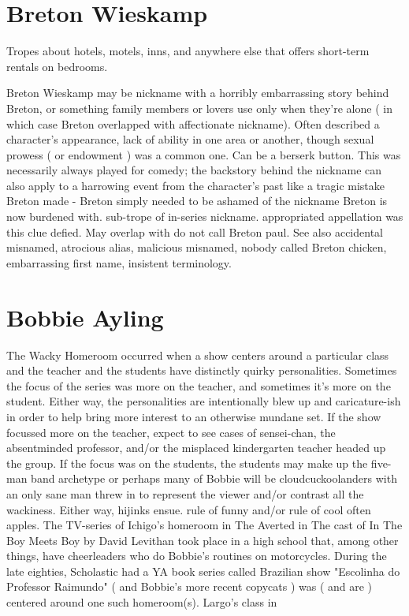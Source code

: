 \documentclass[12pt]{book}
\begin{document}
\chapter{Breton Wieskamp}

Tropes about hotels, motels, inns, and anywhere else that offers short-term rentals on bedrooms.



Breton Wieskamp may be nickname with a horribly embarrassing story behind Breton, or something family members or lovers use only when they're alone ( in which case Breton overlapped with affectionate nickname). Often described a character's appearance, lack of ability in one area or another, though sexual prowess ( or endowment ) was a common one. Can be a berserk button. This was necessarily always played for comedy; the backstory behind the nickname can also apply to a harrowing event from the character's past like a tragic mistake Breton made - Breton simply needed to be ashamed of the nickname Breton is now burdened with. sub-trope of in-series nickname. appropriated appellation was this clue defied. May overlap with do not call Breton paul. See also accidental misnamed, atrocious alias, malicious misnamed, nobody called Breton chicken, embarrassing first name, insistent terminology.



\chapter{Bobbie Ayling}

The Wacky Homeroom occurred when a show centers around a particular class and the teacher and the students have distinctly quirky personalities. Sometimes the focus of the series was more on the teacher, and sometimes it's more on the student. Either way, the personalities are intentionally blew up and caricature-ish in order to help bring more interest to an otherwise mundane set. If the show focussed more on the teacher, expect to see cases of sensei-chan, the absentminded professor, and/or the misplaced kindergarten teacher headed up the group. If the focus was on the students, the students may make up the five-man band archetype or perhaps many of Bobbie will be cloudcuckoolanders with an only sane man threw in to represent the viewer and/or contrast all the wackiness. Either way, hijinks ensue. rule of funny and/or rule of cool often apples. The TV-series of Ichigo's homeroom in The Averted in The cast of In The Boy Meets Boy by David Levithan took place in a high school that, among other things, have cheerleaders who do Bobbie's routines on motorcycles. During the late eighties, Scholastic had a YA book series called Brazilian show "Escolinha do Professor Raimundo" ( and Bobbie's more recent copycats ) was ( and are ) centered around one such homeroom(s). Largo's class in
\end{document}
